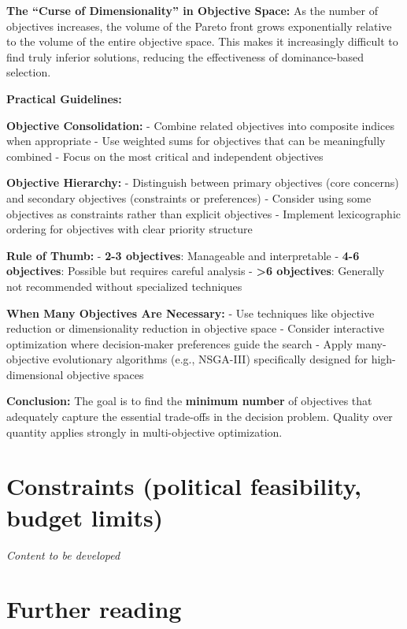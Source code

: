 \documentclass[
  letterpaper,
  DIV=11,
  numbers=noendperiod]{scrreprt}
\begin{document}
\textbf{The ``Curse of Dimensionality'' in Objective Space:} As the
number of objectives increases, the volume of the Pareto front grows
exponentially relative to the volume of the entire objective space. This
makes it increasingly difficult to find truly inferior solutions,
reducing the effectiveness of dominance-based selection.

\textbf{Practical Guidelines:}

\textbf{Objective Consolidation:} - Combine related objectives into
composite indices when appropriate - Use weighted sums for objectives
that can be meaningfully combined - Focus on the most critical and
independent objectives

\textbf{Objective Hierarchy:} - Distinguish between primary objectives
(core concerns) and secondary objectives (constraints or preferences) -
Consider using some objectives as constraints rather than explicit
objectives - Implement lexicographic ordering for objectives with clear
priority structure

\textbf{Rule of Thumb:} - \textbf{2-3 objectives}: Manageable and
interpretable - \textbf{4-6 objectives}: Possible but requires careful
analysis - \textbf{\textgreater6 objectives}: Generally not recommended
without specialized techniques

\textbf{When Many Objectives Are Necessary:} - Use techniques like
objective reduction or dimensionality reduction in objective space -
Consider interactive optimization where decision-maker preferences guide
the search - Apply many-objective evolutionary algorithms (e.g.,
NSGA-III) specifically designed for high-dimensional objective spaces

\textbf{Conclusion:} The goal is to find the \textbf{minimum number} of
objectives that adequately capture the essential trade-offs in the
decision problem. Quality over quantity applies strongly in
multi-objective optimization.

\section{Constraints (political feasibility, budget
limits)}\label{constraints-political-feasibility-budget-limits}

\emph{Content to be developed}

\section*{Further reading}\label{further-reading-15}
\end{document}

